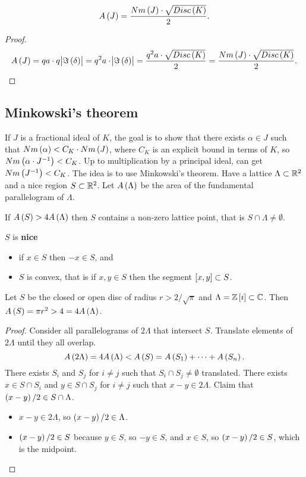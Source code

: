 \begin{proposition}
$$ A\br{J} = \dfrac{Nm\br{J} \cdot \sqrt{Disc\br{K}}}{2}. $$
\end{proposition}

\begin{proof}
$$ A\br{J} = qa \cdot q\abs{\Im\br{\delta}} = q^2a \cdot \abs{\Im\br{\delta}} = \dfrac{q^2a \cdot \sqrt{Disc\br{K}}}{2} = \dfrac{Nm\br{J} \cdot \sqrt{Disc\br{K}}}{2}. $$
\end{proof}

\subsection{Minkowski's theorem}

If $ J $ is a fractional ideal of $ K $, the goal is to show that there exists $ \alpha \in J $ such that $ Nm\br{\alpha} < C_K \cdot Nm\br{J} $, where $ C_K $ is an explicit bound in terms of $ K $, so $ Nm\br{\alpha \cdot J^{-1}} < C_K $. Up to multiplication by a principal ideal, can get $ Nm\br{J^{-1}} < C_K $. The idea is to use Minkowski's theorem. Have a lattice $ \Lambda \subset \mathbb{R}^2 $ and a nice region $ S \subset \mathbb{R}^2 $. Let $ A\br{\Lambda} $ be the area of the fundamental parallelogram of $ \Lambda $.

\begin{theorem}
If $ A\br{S} > 4A\br{\Lambda} $ then $ S $ contains a non-zero lattice point, that is $ S \cap \Lambda \ne \emptyset $.
\end{theorem}

$ S $ is \textbf{nice}
\begin{itemize}
\item if $ x \in S $ then $ -x \in S $, and
\item $ S $ is convex, that is if $ x, y \in S $ then the segment $ \sbr{x, y} \subset S $.
\end{itemize}

\begin{example*}
Let $ S $ be the closed or open disc of radius $ r > 2 / \sqrt{\pi} $ and $ \Lambda = \Z\sbr{i} \subset \C $. Then $ A\br{S} = \pi r^2 > 4 = 4A\br{\Lambda} $.
\end{example*}

\begin{proof}
Consider all parallelograms of $ 2\Lambda $ that intersect $ S $. Translate elements of $ 2\Lambda $ until they all overlap.
$$ A\br{2\Lambda} = 4A\br{\Lambda} < A\br{S} = A\br{S_1} + \dots + A\br{S_n}. $$
There exists $ S_i $ and $ S_j $ for $ i \ne j $ such that $ S_i \cap S_j \ne \emptyset $ translated. There exists $ x \in S \cap S_i $ and $ y \in S \cap S_j $ for $ i \ne j $ such that $ x - y \in 2\Lambda $. Claim that $ \br{x - y} / 2 \in S \cap \Lambda $.
\begin{itemize}
\item $ x - y \in 2\Lambda $, so $ \br{x - y} / 2 \in \Lambda $.
\item $ \br{x - y} / 2 \in S $ because $ y \in S $, so $ -y \in S $, and $ x \in S $, so $ \br{x - y} / 2 \in S $, which is the midpoint.
\end{itemize}
\end{proof}

